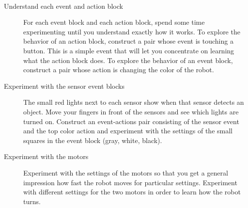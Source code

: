 
\label{a.tips}

\
\begin{description}

\item[Understand each event and action block] For each event block and
each action block, spend some time experimenting until you understand
exactly how it works. To explore the behavior of an action block,
construct a pair whose event is touching a button. This is a simple
event that will let you concentrate on learning what the action block
does. To explore the behavior of an event block, construct a pair whose
action is changing the color of the robot.

\item[Experiment with the sensor event blocks] The small red lights next
to each sensor show when that sensor detects an object. Move your
fingers in front of the sensors and see which lights are turned on.
Construct an event-actions pair consisting of the sensor event and the
top color action and experiment with the settings of the small squares
in the event block (gray, white, black).

\item[Experiment with the motors] Experiment with the settings of the
motors so that you get a general impression how fast the robot moves for
particular settings. Experiment with different settings for the two
motors in order to learn how the robot turns.

\end{description}



